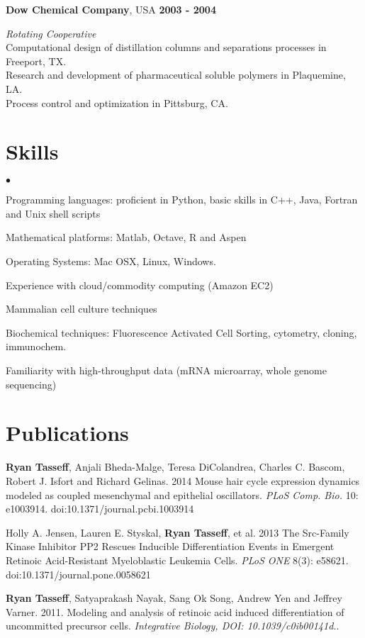 \documentclass[margin,line]{res}
\newenvironment{list2}{
  \begin{list}{$\bullet$}{%
      \setlength{\itemsep}{0in}
      \setlength{\parsep}{0in} \setlength{\parskip}{0in}
      \setlength{\topsep}{0in} \setlength{\partopsep}{0in} 
      \setlength{\leftmargin}{0.2in}}}{\end{list}}
\begin{document}
\begin{resume}
{\bf Dow Chemical Company},  USA \hfill {\bf 2003 - 2004}

\vspace{-.35cm}
{\em Rotating Cooperative}\\
Computational design of distillation columns and separations processes in Freeport, TX.\\
Research and development of pharmaceutical soluble polymers in Plaquemine, LA.\\
Process control and optimization in Pittsburg, CA.  


\section{\sc Skills} 
\begin{list2}
\item Programming languages: proficient in Python, basic skills in C++, Java, Fortran and Unix shell scripts 
\item Mathematical platforms:  Matlab, Octave, R and Aspen
\item Operating Systems:  Mac OSX, Linux, Windows.
\item Experience with cloud/commodity computing (Amazon EC2)
\item Mammalian cell culture techniques
\item Biochemical techniques: Fluorescence Activated Cell Sorting, cytometry, cloning, immunochem.
\item Familiarity with high-throughput data (mRNA microarray, whole genome sequencing)
\end{list2}



\section{\sc Publications}
{\bf Ryan Tasseff}, Anjali Bheda-Malge, Teresa DiColandrea, Charles C. Bascom, Robert J. Isfort and Richard Gelinas. 2014
Mouse hair cycle expression dynamics modeled as coupled mesenchymal and epithelial oscillators.  
{\it PLoS Comp. Bio. } 10: e1003914. doi:10.1371/journal.pcbi.1003914

Holly A. Jensen, Lauren E. Styskal, {\bf Ryan Tasseff}, et al. 2013
The Src-Family Kinase Inhibitor PP2 Rescues Inducible Differentiation Events 
in Emergent Retinoic Acid-Resistant Myeloblastic Leukemia Cells.
{\it PLoS ONE} 8(3): e58621. doi:10.1371/journal.pone.0058621

{\bf Ryan Tasseff}, Satyaprakash Nayak, Sang Ok Song, Andrew Yen and Jeffrey Varner. 2011. 
Modeling and analysis of retinoic acid induced differentiation of uncommitted precursor cells.
{\it Integrative Biology, DOI: 10.1039/c0ib00141d.}. 


\end{resume}
\end{document}
